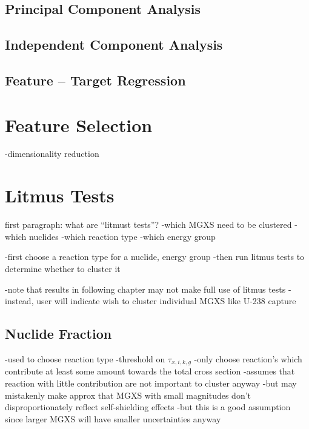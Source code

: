 \subsection{Principal Component Analysis}
\label{subsec:chap10-feature-transform-pca}

\subsection{Independent Component Analysis}
\label{subsec:chap10-feature-transform-ica}

\subsection{Feature -- Target Regression}
\label{subsec:chap10-feature-transform-regression}


\section{Feature Selection}
\label{sec:chap10-feature-select}

-dimensionality reduction

\section{Litmus Tests}
\label{sec:chap10-litmus}

first paragraph: what are ``litmust tests''?
-which \ac{MGXS} need to be clustered
  -which nuclides
  -which reaction type
  -which energy group

-first choose a reaction type for a nuclide, energy group
-then run litmus tests to determine whether to cluster it

-note that results in following chapter may not make full use of litmus tests
  -instead, user will indicate wish to cluster individual MGXS like U-238 capture

\subsection{Nuclide Fraction}
\label{subsec:chap10-litmus-nuc-frac}

-used to choose reaction type
-threshold on $\tau_{x,i,k,g}$
-only choose reaction's which contribute at least some amount towards the total cross section
  -assumes that reaction with little contribution are not important to cluster anyway
  -but may mistakenly make approx that MGXS with small magnitudes don't disproportionately reflect self-shielding effects
    -but this is a good assumption since larger MGXS will have smaller uncertainties anyway


